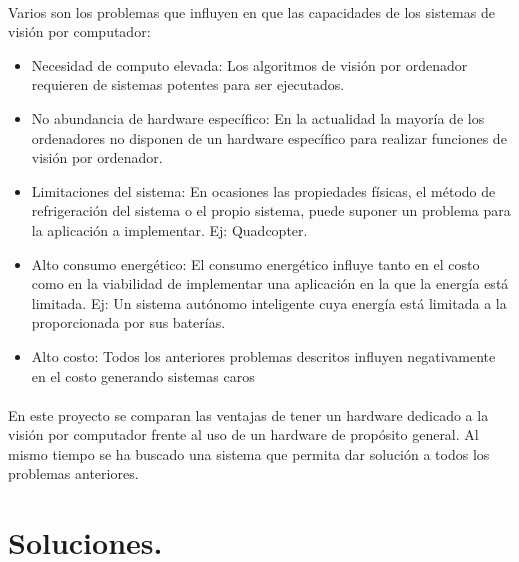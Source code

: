 \documentclass[a4paper,12pt,titlepage,final]{book}
\begin{document}
\paragraph{}
Varios son los problemas que influyen en que las capacidades de los sistemas de visión por computador:

\begin{itemize}
  \item Necesidad de computo elevada: Los algoritmos de visión por ordenador requieren de sistemas potentes para ser ejecutados.
  \item No abundancia de hardware específico: En la actualidad la mayoría de los ordenadores no disponen de un hardware específico para realizar funciones de visión por ordenador.
  \item Limitaciones del sistema: En ocasiones las propiedades físicas, el método de refrigeración del sistema o el propio sistema, puede suponer un problema para la aplicación a implementar. Ej: Quadcopter.
  \item Alto consumo energético: El consumo energético influye tanto en el costo como en la viabilidad de implementar una aplicación en la que la energía está limitada. Ej: Un sistema autónomo inteligente cuya energía está limitada a la proporcionada por sus baterías.
  \item Alto costo: Todos los anteriores problemas descritos influyen negativamente en el costo generando sistemas caros
\end{itemize}

\paragraph{}
En este proyecto se comparan las ventajas de tener un hardware dedicado a la visión por computador frente al uso de un hardware de propósito general. Al mismo tiempo se ha buscado una sistema que permita dar solución a todos los problemas anteriores.

\section{Soluciones.}
\subsection*{}
\subsubsection*{}
\end{document}
